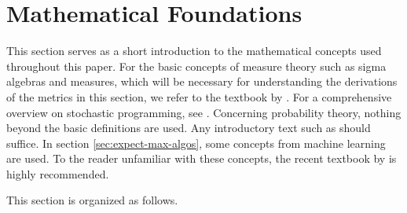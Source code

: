\section{Mathematical Foundations}
\label{sec:math-foundations}
This section serves as a short introduction to the mathematical concepts used throughout this paper.
For the basic concepts of measure theory such as sigma algebras and measures, which will be necessary for understanding the derivations of the metrics in this section, we refer to the textbook by .
For a comprehensive overview on stochastic programming, see .
Concerning probability theory, nothing beyond the basic definitions are used.
Any introductory text such as  should suffice.
In section \ref{sec:expect-max-algos}, some concepts from machine learning are used.
To the reader unfamiliar with these concepts, the recent textbook by  is highly recommended.

This section is organized as follows.
